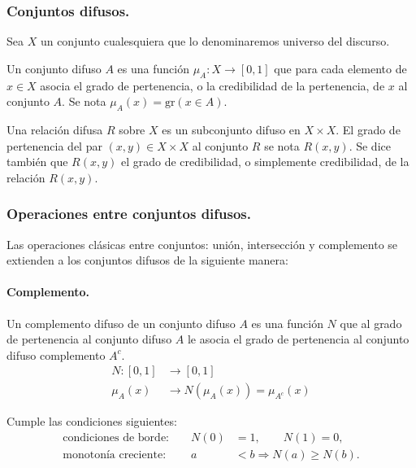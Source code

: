\documentclass[a5paper,doc,10pt,noapacite]{apa6}
\begin{document}
{{\subsubsection{Conjuntos difusos.}

Sea \(X\) un conjunto cualesquiera que lo denominaremos universo del discurso.

\begin{APAitemize}
    \item Un conjunto difuso \(A\) es una función \(\mu _A: X \rightarrow [0,1]\) que para cada elemento de \(x \in X\) asocia el grado de pertenencia, o la credibilidad de la pertenencia, de \(x\) al conjunto \(A\). Se nota \(\mu _A(x) = \text{gr}(x \in A)\).
    
    \item Una relación difusa \(R\) sobre \(X\) es un subconjunto difuso en \(X \times X\). El grado de pertenencia del par \((x,y) \in X \times X\) al conjunto \(R\) se nota \(R(x,y)\). Se dice también que \(R(x,y)\) el grado de credibilidad, o simplemente credibilidad, de la relación \(R(x,y)\).
\end{APAitemize}

\subsubsection{Operaciones entre conjuntos difusos.}

Las operaciones clásicas entre conjuntos: unión, intersección y complemento se extienden a los conjuntos difusos de la siguiente manera:

\paragraph{Complemento.}

Un complemento difuso de un conjunto difuso \(A\) es una función \(N\) que al grado de pertenencia al conjunto difuso \(A\) le asocia el grado de pertenencia al conjunto difuso complemento \(A^{c}\).
    \begin{align*}
    N: [0,1] & \longrightarrow [0,1]\\
    \mu _A(x) & \longrightarrow N(\mu _A(x)) = \mu _{A^{c}}(x)
    \end{align*}

Cumple las condiciones siguientes:
\begin{align*}
	\text{condiciones de borde:	}&	& N(0) &= 1,\qquad  N(1) = 0,
	\\
	\text{monotonía creciente:		}&	& a&<b	\Rightarrow N(a) \geq N(b).
\end{align*}

}}
\end{document}
